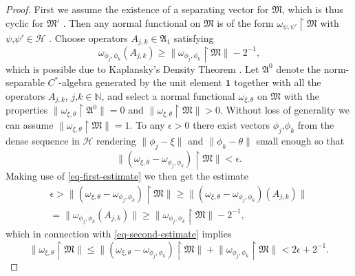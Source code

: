 \documentclass[11pt,twoside,openright]{report}
\theoremstyle{definition}
\theoremstyle{plain}
\theoremstyle{remark}
\theoremstyle{assumption}
\newcommand{\norm}[1]{\lVert #1 \rVert}
\newcommand{\Nbb}{\mathbb{N}}
\newcommand{\Afrak}{\mathfrak{A}}
\newcommand{\Mfrak}{\mathfrak{M}}
\newcommand{\Hscr}{\mathscr{H}}
\newcommand{\unit}{\mathbf{1}}
\begin{document}
\begin{proof}
  First we assume the existence of a separating vector for $\Mfrak$,
  which is thus cyclic for $\Mfrak'$
  \cite[Section~I.1.4]{dixmier:1981}. Then any normal functional on
  $\Mfrak$ is of the form $\omega_{\psi , \psi'} \restriction \Mfrak$
  with $\psi \text{,} \psi' \in \Hscr$
  \cite[Theorem~V.3.15]{takesaki:1979}. Choose operators $A_{j , k}
  \in \Afrak_1$ satisfying
  \begin{equation}
    \label{eq-first-estimate}
    \omega_{\phi_j , \phi_k} ( A_{j , k} ) \geqslant
    \norm{\omega_{\phi_j , \phi_k} \restriction \Mfrak} - 2^{-1}
    \text{,}
  \end{equation}
  which is possible due to Kaplansky's Density Theorem
  \cite[Theorem~2.3.3]{pedersen:1979}. Let $\Afrak^0$ denote the
  norm-separable $C^*$-algebra generated by the unit element $\unit$
  together with all the operators $A_{j , k}$, $j \text{,} k \in
  \Nbb$, and select a normal functional $\omega_{\xi , \theta}$ on
  $\Mfrak$ with the properties $\norm{\omega_{\xi , \theta}
  \restriction \Afrak^0} = 0$ and $\norm{\omega_{\xi , \theta}
  \restriction \Mfrak} > 0$. Without loss of generality we can assume
  $\norm{\omega_{\xi , \theta} \restriction \Mfrak} = 1$. To any
  $\epsilon > 0$ there exist vectors $\phi_j \text{,} \phi_k$ from the
  dense sequence in $\Hscr$ rendering $\norm{\phi_j - \xi}$ and
  $\norm{\phi_k - \theta}$ small enough so that
  \begin{equation}
    \label{eq-second-estimate}
    \norm{( \omega_{\xi , \theta} - \omega_{\phi_j , \phi_k} )
    \restriction \Mfrak} < \epsilon \text{.}
  \end{equation}
  Making use of \eqref{eq-first-estimate} we then get the estimate
  \begin{multline*}
    \epsilon > \norm{( \omega_{\xi , \theta} - \omega_{\phi_j ,
    \phi_k} ) \restriction \Mfrak} \geqslant \norm{( \omega_{\xi ,
    \theta} - \omega_{\phi_j , \phi_k} ) ( A_{j , k} )} \\
    = \norm{\omega_{\phi_j , \phi_k} ( A_{j , k} )} \geqslant
    \norm{\omega_{\phi_j , \phi_k} \restriction \Mfrak} - 2^{-1}
    \text{,} 
  \end{multline*}
  which in connection with \eqref{eq-second-estimate} implies
  \begin{equation*}
    \norm{\omega_{\xi , \theta} \restriction \Mfrak} \leqslant \norm{(
    \omega_{\xi , \theta} - \omega_{\phi_j , \phi_k} ) \restriction
    \Mfrak} + \norm{\omega_{\phi_j ,\phi_k} \restriction \Mfrak} < 2
    \epsilon + 2^{-1} \text{.}
  \end{equation*}

\end{proof}
\end{document}
